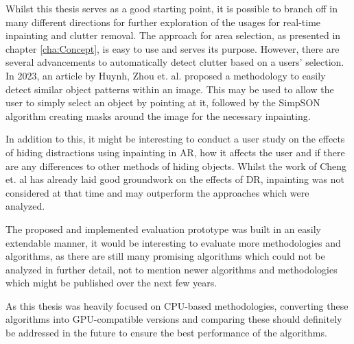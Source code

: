 Whilst this thesis serves as a good starting point, it is possible to branch off in many different directions for further exploration of the usages for real-time inpainting
and clutter removal. The approach for area selection, as presented in chapter \ref{cha:Concept}, is easy to use and serves its purpose. However, there are several advancements to automatically detect clutter based
on a users' selection. In 2023, an article by Huynh, Zhou et. al. \cite{HuynhChuong2023SSPC} proposed a methodology to easily detect similar object patterns within an image. This may be used to allow the user to simply select an object by pointing at it, followed by the SimpSON algorithm creating masks around the image for the necessary inpainting.

In addition to this, it might be interesting to conduct a user study on the effects of hiding distractions using inpainting in AR, how it affects the user and if there are any differences to other methods of hiding objects. Whilst the work of Cheng et. al \cite{ChengYiFei2022TUDR} has already laid good groundwork on the effects of DR, inpainting was not considered at that time
and may outperform the approaches which were analyzed.

The proposed and implemented evaluation prototype was built in an easily extendable manner, it would be interesting to evaluate more methodologies and algorithms, as there are still many promising algorithms which could not be analyzed in further detail, not to mention newer algorithms and methodologies which might be published over the next few years.

As this thesis was heavily focused on CPU-based methodologies, converting these algorithms into GPU-compatible versions and comparing these should definitely be addressed in the future to ensure the best performance of the algorithms.